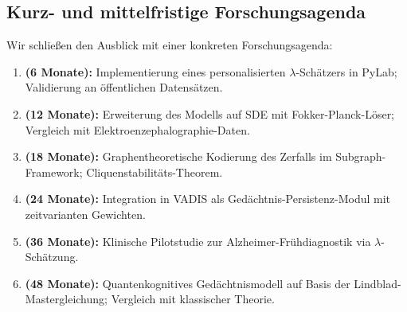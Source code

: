 ﻿\documentclass[12pt,a4paper,twoside]{article}
\theoremstyle{theormstyle}
\theoremstyle{proofstyle}
\begin{document}
	\subsection{Kurz- und mittelfristige Forschungsagenda}
	
	Wir schließen den Ausblick mit einer konkreten Forschungsagenda:
	\begin{enumerate}[label=\textbf{F\arabic*}]
		\item \textbf{(6 Monate):} Implementierung eines personalisierten
		$\lambda$-Schätzers in PyLab; Validierung an öffentlichen Datensätzen.
		\item \textbf{(12 Monate):} Erweiterung des Modells auf SDE mit
		Fokker-Planck-Löser; Vergleich mit Elektroenzephalographie-Daten.
		\item \textbf{(18 Monate):} Graphentheoretische Kodierung des Zerfalls
		im Subgraph-Framework; Cliquenstabilitäts-Theorem.
		\item \textbf{(24 Monate):} Integration in VADIS als
		Gedächtnis-Persistenz-Modul mit zeitvarianten Gewichten.
		\item \textbf{(36 Monate):} Klinische Pilotstudie zur
		Alzheimer-Frühdiagnostik via $\lambda$-Schätzung.
		\item \textbf{(48 Monate):} Quantenkognitives Gedächtnismodell
		auf Basis der Lindblad-Master\-gleichung; Vergleich mit klassischer
		Theorie.
	\end{enumerate}
	
\end{document}
